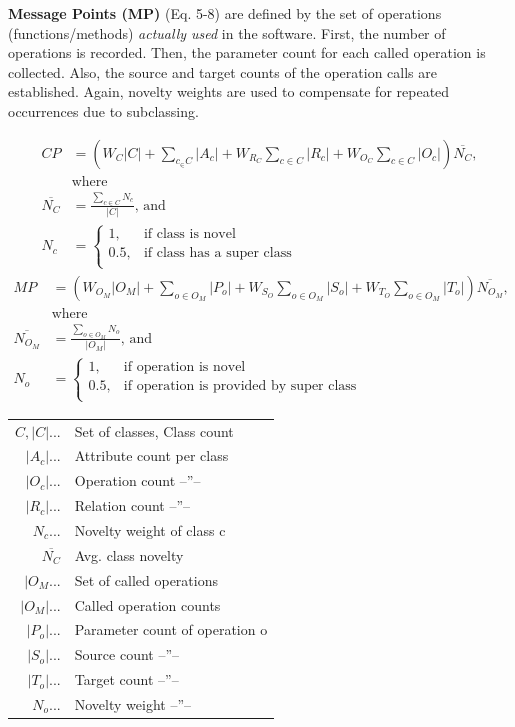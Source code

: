 \documentclass[conference]{IEEEtran}
\begin{document}
\textbf{Message Points (MP)} (Eq. 5-8) are defined by the set of operations
(functions/methods) \emph{actually used} in the software. First, the number
of operations is recorded. Then, the parameter count for each called
operation is collected. Also, the source and target counts of the
operation calls are established. Again, novelty weights are used to
compensate for repeated occurrences due to subclassing.

\small
\begin{align}
CP &= \left(W_C |C| + \sum_{c_ \in C} |A_c| + W_{R_C} \sum_{c \in C} |R_c| + W_{O_C} \sum_{c \in C} |O_c| \right) \overline{N_C},\\ &\text{where}\\
\overline{N_C} &= \frac{\sum_{c \in C} N_c}{|C|},\, \text{and}\\
N_c &=
\begin{cases}
1,& \text{if class is novel}\\
0.5,& \text{if class has a super class}\\
\end{cases}
\end{align}
\begin{align}
MP &= \left(W_{O_M} |O_M| + \sum_{o \in O_M} |P_o| + W_{S_O} \sum_{o \in O_M} |S_o| + W_{T_O} \sum_{o \in O_M} |T_o| \right) \overline{N_{O_M}},\\ &\text{where}\\
\overline{N_{O_M}} &= \frac{\sum_{o \in O_M} N_o}{|O_M|},\,\text{and}\\
N_o &=
\begin{cases}
1,& \text{if operation is novel}\\
0.5,& \text{if operation is provided by super class}\\
\end{cases}
\end{align}

\begin{tabularx}{\linewidth}{rX}
\hline
$C, |C|...$ & Set of classes, Class count \\
$|A_c|...$  & Attribute count per class   \\
$|O_c|...$  & Operation count --''--      \\
$|R_c|...$  & Relation count --''--       \\
$N_c...$    & Novelty weight of class c \\
$\overline{N_C}$ & Avg. class novelty \\
$|O_M...$  & Set of called operations \\
$|O_M|...$ & Called operation counts \\
$|P_o|...$ & Parameter count of operation o \\
$|S_o|...$ & Source count --''-- \\
$|T_o|...$ & Target count --''-- \\
$N_o...$   & Novelty weight --''-- \\
\end{tabularx}
\normalsize
\end{document}
